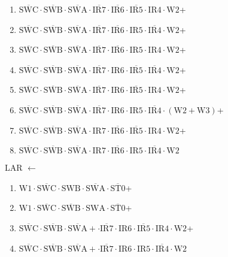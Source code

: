 \documentclass[UTF8]{ctexart}
\begin{document}
\begin{enumerate}[\indent\indent]
	\item $\overline{\text{SWC}} \cdot\overline{\text{SWB}}\cdot \overline{\text{SWA}} \cdot \overline{\text{IR7}} \cdot \overline{\text{IR6}} \cdot \overline{\text{IR5}} \cdot \text{IR4} \cdot \text{W2}$+
	\item $\overline{\text{SWC}} \cdot\overline{\text{SWB}}\cdot \overline{\text{SWA}} \cdot \overline{\text{IR7}} \cdot \overline{\text{IR6}} \cdot \text{IR5} \cdot \overline{\text{IR4}} \cdot \text{W2}$+
	\item $\overline{\text{SWC}} \cdot\overline{\text{SWB}}\cdot \overline{\text{SWA}} \cdot \overline{\text{IR7}} \cdot \overline{\text{IR6}} \cdot \text{IR5} \cdot \text{IR4} \cdot \text{W2}$+
	\item $\overline{\text{SWC}} \cdot\overline{\text{SWB}}\cdot \overline{\text{SWA}} \cdot \overline{\text{IR7}} \cdot \text{IR6} \cdot \overline{\text{IR5}} \cdot \overline{\text{IR4}} \cdot \text{W2}$+
	\item $\overline{\text{SWC}} \cdot\overline{\text{SWB}}\cdot \overline{\text{SWA}} \cdot \overline{\text{IR7}} \cdot \text{IR6} \cdot \overline{\text{IR5}} \cdot \text{IR4} \cdot \text{W2}$+
	\item $\overline{\text{SWC}} \cdot\overline{\text{SWB}}\cdot \overline{\text{SWA}} \cdot \overline{\text{IR7}} \cdot \text{IR6} \cdot \text{IR5} \cdot \overline{\text{IR4}} \cdot (\text{W2} + \text{W3})$+
	\item $\overline{\text{SWC}} \cdot\overline{\text{SWB}}\cdot \overline{\text{SWA}} \cdot \text{IR7} \cdot \overline{\text{IR6}} \cdot \overline{\text{IR5}} \cdot \text{IR4} \cdot \text{W2}$+
	\item $\overline{\text{SWC}} \cdot\overline{\text{SWB}}\cdot \overline{\text{SWA}} \cdot \text{IR7} \cdot \overline{\text{IR6}} \cdot \text{IR5} \cdot \overline{\text{IR4}} \cdot \text{W2}$
\end{enumerate}
LAR $\leftarrow$
\begin{enumerate}[\indent\indent]
	\item $\text{W1} \cdot \overline{\text{SWC}} \cdot \text{SWB} \cdot \overline{\text{SWA}} \cdot \overline{\text{ST0}}$+
	\item $\text{W1} \cdot \overline{\text{SWC}} \cdot \overline{\text{SWB}} \cdot \text{SWA} \cdot \overline{\text{ST0}}$+
	\item $\overline{\text{SWC}} \cdot\overline{\text{SWB}}\cdot \overline{\text{SWA}}+ \cdot \overline{\text{IR7}} \cdot \text{IR6} \cdot \overline{\text{IR5}} \cdot \text{IR4} \cdot \text{W2}$+
	\item $\overline{\text{SWC}} \cdot\overline{\text{SWB}}\cdot \overline{\text{SWA}}+ \cdot \overline{\text{IR7}} \cdot \text{IR6} \cdot \text{IR5} \cdot \overline{\text{IR4}} \cdot \text{W2}$
\end{enumerate}
\end{document}
